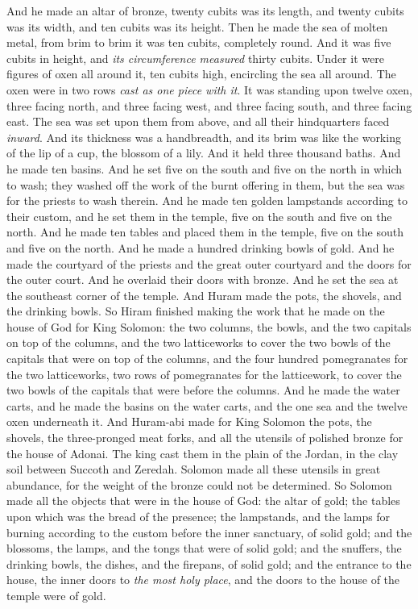 \begin{biblechapter} %
 And he made an altar of bronze, twenty cubits was its length, and twenty cubits was its width, and ten cubits was its height.
\verse Then he made the sea of molten metal, from brim to brim it was ten cubits, completely round. And it was five cubits in height, and \textit{its circumference measured} thirty cubits.
\verse Under it were figures of oxen all around it, ten cubits high, encircling the sea all around. The oxen were in two rows \textit{cast as one piece with it}.
\verse It was standing upon twelve oxen, three facing north, and three facing west, and three facing south, and three facing east. The sea was set upon them from above, and all their hindquarters faced \textit{inward}.
\verse And its thickness was a handbreadth, and its brim was like the working of the lip of a cup, the blossom of a lily. And it held three thousand baths.
\verse And he made ten basins. And he set five on the south and five on the north in which to wash; they washed off the work of the burnt offering in them, but the sea was for the priests to wash therein.
\verse And he made ten golden lampstands according to their custom, and he set them in the temple, five on the south and five on the north.
\verse And he made ten tables and placed them in the temple, five on the south and five on the north. And he made a hundred drinking bowls of gold.
\verse And he made the courtyard of the priests and the great outer courtyard and the doors for the outer court. And he overlaid their doors with bronze.
\verse And he set the sea at the southeast corner of the temple.
\verse And Huram made the pots, the shovels, and the drinking bowls. So Hiram finished making the work that he made on the house of God for King Solomon:
\verse the two columns, the bowls, and the two capitals on top of the columns, and the two latticeworks to cover the two bowls of the capitals that were on top of the columns,
\verse and the four hundred pomegranates for the two latticeworks, two rows of pomegranates for the latticework, to cover the two bowls of the capitals that were before the columns.
\verse And he made the water carts, and he made the basins on the water carts,
\verse and the one sea and the twelve oxen underneath it.
\verse And Huram-abi made for King Solomon the pots, the shovels, the three-pronged meat forks, and all the utensils of polished bronze for the house of Adonai.
\verse The king cast them in the plain of the Jordan, in the clay soil between Succoth and Zeredah.
\verse Solomon made all these utensils in great abundance, for the weight of the bronze could not be determined.
\verse So Solomon made all the objects that were in the house of God: the altar of gold; the tables upon which was the bread of the presence;
\verse the lampstands, and the lamps for burning according to the custom before the inner sanctuary, of solid gold;
\verse and the blossoms, the lamps, and the tongs that were of solid gold;
\verse and the snuffers, the drinking bowls, the dishes, and the firepans, of solid gold; and the entrance to the house, the inner doors to \textit{the most holy place}, and the doors to the house of the temple were of gold.
\end{biblechapter}

